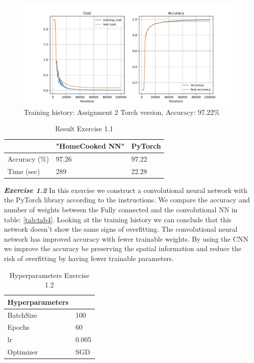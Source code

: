 \documentclass[a4paper,10pt]{article}
\begin{document}
\begin{figure}[ht!]
\centering
\includegraphics[width=120mm]{figures/assignment_3/A2_torchversion.png}
\caption{Training history: Assignment 2 Torch version, Accuracy: 97.22\%}
\label{fig:a2torchver}
\end{figure}


\begin{table}[ht!]
\centering
\begin{tabular}{lll}\hline
 &  \textbf{"HomeCooked NN"}& \textbf{PyTorch} \\ \hline
 Accuracy (\%) &  97.26&  97.22\\
 Time (sec)& 289 & 22.28\\ \hline
\end{tabular}
\caption{Result Exercise 1.1}
\label{tab:tab2}
\end{table}


\newpage

\textit{\textbf{Exercise 1.2}}
In this exercise we construct a convolutional neural network with the PyTorch library according to the instructions. We compare the accuracy and number of weights between the Fully connected and the convolutional NN in table: \ref{tab:tab4}. Looking at the training history we can conclude that this network doesn't show the same signs of overfitting. The convolutional neural network has improved accuracy with fewer trainable weights. By using the CNN we improve the accuracy be preserving the spatial information and reduce the risk of overfitting by having fewer trainable parameters. 

\begin{table}[ht!]
\centering
\begin{tabular}{ll}\hline
 \textbf{Hyperparameters}&    \\ \hline
 BatchSize&  100  \\
 Epochs&  60 \\ 
 lr& 0.005 \\
Optimizer& SGD  \\\hline
\end{tabular}
\caption{Hyperparameters Exercise 1.2}
\label{tab:tab3}
\end{table}
\end{document}
